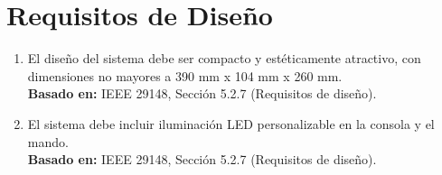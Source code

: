 \documentclass{article}
\begin{document}
\section{Requisitos de Diseño}
\begin{enumerate}[label=RD-\arabic*]
    \item El diseño del sistema debe ser compacto y estéticamente atractivo, con dimensiones no mayores a 390 mm x 104 mm x 260 mm. \\
    \textbf{Basado en:} IEEE 29148, Sección 5.2.7 (Requisitos de diseño).
    
    \item El sistema debe incluir iluminación LED personalizable en la consola y el mando. \\
    \textbf{Basado en:} IEEE 29148, Sección 5.2.7 (Requisitos de diseño).
\end{enumerate}
\end{document}
